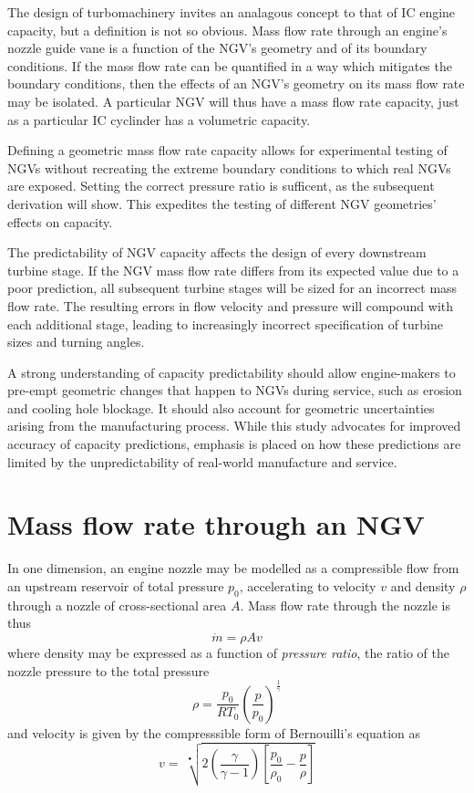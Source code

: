 \documentclass[11pt, twoside]{report}
\begin{document}
The design of turbomachinery invites an analagous concept to that of IC engine capacity, but a definition is not so obvious. Mass flow rate through an engine's nozzle guide vane is a function of the NGV's geometry and of its boundary conditions. If the mass flow rate can be quantified in a way which mitigates the boundary conditions, then the effects of an NGV's geometry on its mass flow rate may be isolated. A particular NGV will thus have a mass flow rate capacity, just as a particular IC cyclinder has a volumetric capacity.

Defining a geometric mass flow rate capacity allows for experimental testing of NGVs without recreating the extreme boundary conditions to which real NGVs are exposed. Setting the correct pressure ratio is sufficent, as the subsequent derivation will show. This expedites the testing of different NGV geometries' effects on capacity.

The predictability of NGV capacity affects the design of every downstream turbine stage. If the NGV mass flow rate differs from its expected value due to a poor prediction, all subsequent turbine stages will be sized for an incorrect mass flow rate. The resulting errors in flow velocity and pressure will compound with each additional stage, leading to increasingly incorrect specification of turbine sizes and turning angles.

A strong understanding of capacity predictability should allow engine-makers to pre-empt geometric changes that happen to NGVs during service, such as erosion and cooling hole blockage. It should also account for geometric uncertainties arising from the manufacturing process. While this study advocates for improved accuracy of capacity predictions, emphasis is placed on how these predictions are limited by the unpredictability of real-world manufacture and service.


\section{Mass flow rate through an NGV}

In one dimension, an engine nozzle may be modelled as a compressible flow from an upstream reservoir of total pressure $p_0$, accelerating to velocity $v$ and density $\rho$ through a nozzle of cross-sectional area $A$. Mass flow rate through the nozzle is thus
\begin{equation}
\dot{m} = \rho A v
\end{equation}
where density may be expressed as a function of \textit{pressure ratio}, the ratio of the nozzle pressure to the total pressure
\begin{equation}
\rho = \frac{p_0}{R T_0} \left(\frac{p}{p_0}\right)^\frac{1}{\gamma}
\end{equation}
and velocity is given by the compresssible form of Bernouilli's equation as
\begin{equation}
v = \>
\sqrt[•]{ 
	2 \left( \frac{\gamma}{\gamma - 1} \right) \left[ \frac{p_0}{\rho_0} - \frac{p}{\rho} \right] 
}
\end{equation}
\end{document}

